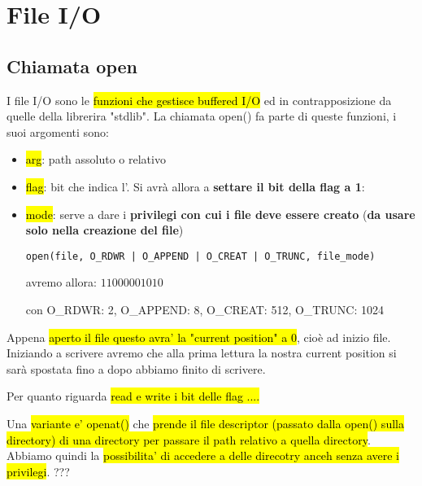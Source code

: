 \newpage
\section{File I/O}


\subsection{Chiamata open}

I file I/O sono le \hl{funzioni che gestisce buffered I/O} ed in contrapposizione da quelle della librerira "stdlib". La chiamata open() fa parte di queste funzioni, i suoi argomenti sono:

\begin{itemize}
	\item \hl{arg}: path assoluto o relativo
	\item \hl{flag}: bit che indica l'. Si avrà allora a \textbf{settare il bit della flag a 1}:
	\item \hl{mode}: serve a dare i \textbf{privilegi con cui i file deve essere creato} (\textbf{da usare solo nella creazione del file})
\begin{lstlisting}
open(file, O_RDWR | O_APPEND | O_CREAT | O_TRUNC, file_mode)
\end{lstlisting}

		avremo allora: $11000001010$

		con O\_RDWR: 2, O\_APPEND: 8, O\_CREAT: 512, O\_TRUNC: 1024
		
		
\end{itemize}

Appena \hl{aperto il file questo avra' la "current position" a 0}, cioè ad inizio file. Iniziando a scrivere avremo che alla prima lettura la nostra current position si sarà spostata fino a dopo abbiamo finito di scrivere.

Per quanto riguarda \hl{read e write i bit delle flag ....}

Una \hl{variante e' openat()} che \hl{prende il file descriptor (passato dalla open() sulla directory) di una directory per passare il path relativo a quella directory}. Abbiamo quindi la \hl{possibilita' di accedere a delle direcotry anceh senza avere i privilegi}. ???
